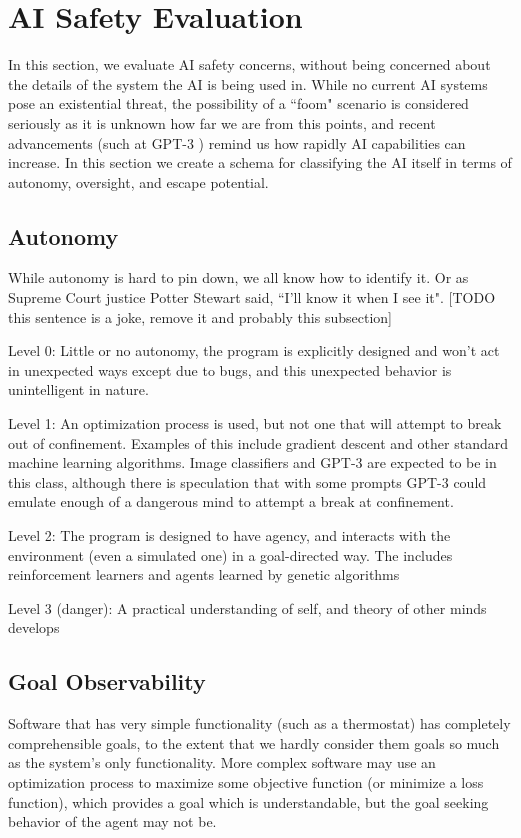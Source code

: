 \documentclass[11pt]{article}
\begin{document}
\section{AI Safety Evaluation}
\label{sec:aisafety}

In this section, we evaluate AI safety concerns, without being concerned about the details of the
system the AI is being used in. While no current AI systems pose an existential threat, the
possibility of a ``foom" scenario \cite{bostrom2001extinction} is considered seriously as it is
unknown how far we are from this points, and recent advancements (such at GPT-3
\cite{brown2020gpt3}) remind us how rapidly AI capabilities can increase. In this section we
create a schema for classifying the AI itself in terms of autonomy, oversight, and escape potential.

\subsection{Autonomy}

While autonomy is hard to pin down, we all know how to identify it. Or as Supreme Court justice
Potter Stewart said, ``I'll know it when I see it". [TODO this sentence is a joke, remove it and
probably this subsection]

Level 0: Little or no autonomy, the program is explicitly designed and won't act in unexpected ways
except due to bugs, and this unexpected behavior is unintelligent in nature.

Level 1: An optimization process is used, but not one that will attempt to break out of confinement.
Examples of this include gradient descent and other standard machine learning algorithms. Image
classifiers and GPT-3 are expected to be in this class, although there is speculation that with some
prompts GPT-3 could emulate enough of a dangerous mind to attempt a break at confinement. 

Level 2: The program is designed to have agency, and interacts with the environment (even a
simulated one) in a goal-directed way. The includes reinforcement learners and agents learned by
genetic algorithms

Level 3 (danger): A practical understanding of self, and theory of other minds develops

\subsection{Goal Observability}

Software that has very simple functionality (such as a thermostat) has completely comprehensible
goals, to the extent that we hardly consider them goals so much as the system's only functionality.
More complex software may use an optimization process to maximize some objective function (or
minimize a loss function), which provides a goal which is understandable, but the goal seeking
behavior of the agent may not be. 
\end{document}
